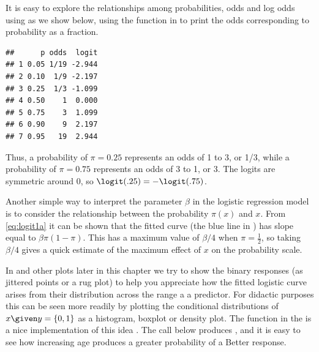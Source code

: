 \documentclass[11pt]{book}
\renewenvironment{knitrout}{\small\renewcommand{\baselinestretch}{.85}}{} %
\begin{document}
It is easy to explore the relationships among probabilities, odds and
log odds using \R as we show below, using the function 
in  to print the odds corresponding to probability 
as a fraction.
\begin{knitrout}
\color{fgcolor}\begin{kframe}
\begin{alltt}
 \hlkwb{<-} \hlstd{(}\hlstd{,} \hlstd{,} \hlstd{,} \hlstd{,} \hlstd{,} \hlstd{,} \hlstd{)}
           \hlstd{=}\hlstd{(}\hlopt{/}\hlstd{(}\hlopt{-}
           \hlstd{=}\hlopt{/}\hlstd{(}\hlopt{-}
\end{alltt}
\begin{verbatim}
##      p odds  logit
## 1 0.05 1/19 -2.944
## 2 0.10  1/9 -2.197
## 3 0.25  1/3 -1.099
## 4 0.50    1  0.000
## 5 0.75    3  1.099
## 6 0.90    9  2.197
## 7 0.95   19  2.944
\end{verbatim}
\end{kframe}
\end{knitrout}
Thus, a probability of $\pi = 0.25$ represents an odds of 1 to 3, or 1/3,
while a probability of $\pi = 0.75$ represents an odds of 3 to 1, or 3.
The logits are symmetric around 0, so $\logit (.25) = - \logit (.75)$.

Another simple way to interpret the parameter $\beta$ in the logistic regression
model is to consider the relationship between the probability $\pi(x)$ and $x$.
From \eqref{eq:logit1a} it can be shown that the fitted curve
(the blue line in ) has slope equal to
$\beta\pi (1-\pi)$.  This has a maximum value of $\beta / 4$ when $\pi = \frac12$,
so taking $\beta / 4$ gives a quick estimate of the maximum effect of $x$
on the probability scale.

In  and other plots later in this chapter we try to show
the binary responses (as jittered points or a rug plot) to help you appreciate how the fitted
logistic curve arises from their distribution across the range a a predictor.
For didactic purposes this can be seen more readily by plotting the conditional distributions
of $x \given y=\{0,1\}$ as a histogram, boxplot or density plot.
The function  in the  is a nice implementation of
this idea \citep{Rot:2005}.  The call below produces ,
and it is easy to see how increasing age produces a greater probability of a Better
response.
\end{document}
